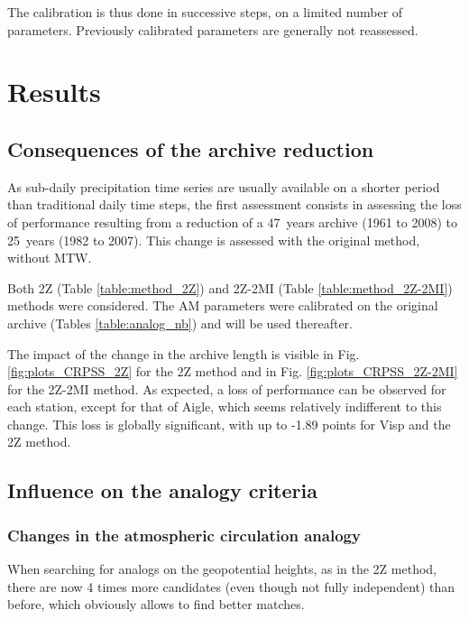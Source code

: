 \documentclass[hess, manuscript]{copernicus}
\begin{document}
The calibration is thus done in successive steps, on a limited number of parameters. Previously calibrated parameters are generally not reassessed. 


\section{Results}


\subsection{Consequences of the archive reduction}
\label{sec:archive_reduction}

As sub-daily precipitation time series are usually available on a shorter period than traditional daily time steps, the first assessment consists in assessing the loss of performance resulting from a reduction of a 47~years archive (1961 to 2008) to 25~years (1982 to 2007). This change is assessed with the original method, without MTW.

Both 2Z (Table \ref{table:method_2Z}) and 2Z-2MI (Table \ref{table:method_2Z-2MI}) methods were considered. The AM parameters were calibrated on the original archive (Tables \ref{table:analog_nb}) and will be used thereafter.

The impact of the change in the archive length is visible in Fig. \ref{fig:plots_CRPSS_2Z} for the 2Z method and in Fig. \ref{fig:plots_CRPSS_2Z-2MI} for the 2Z-2MI method. As expected, a loss of performance can be observed for each station, except for that of Aigle, which seems relatively indifferent to this change. This loss is globally significant, with up to -1.89 points for Visp and the 2Z method. 


\subsection{Influence on the analogy criteria}
\label{sec:influence_criteria}

\subsubsection{Changes in the atmospheric circulation analogy}

When searching for analogs on the geopotential heights, as in the 2Z method, there are now 4 times more candidates (even though not fully independent) than before, which obviously allows to find better matches.
\end{document}
